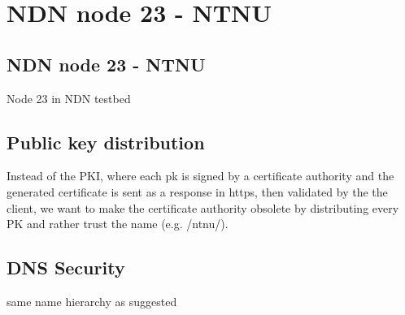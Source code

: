 \chapter{NDN node 23 - NTNU}\label{chp4:} 

\section{NDN node 23 - NTNU}
Node 23 in NDN testbed


\section{Public key distribution}
Instead of the PKI, where each pk is signed by a certificate authority and the generated certificate is sent as a response in https, then validated by the the client, we want to make the certificate authority obsolete by distributing every PK and rather trust the name (e.g. /ntnu/). 

\section{DNS Security}
same name hierarchy as suggested
